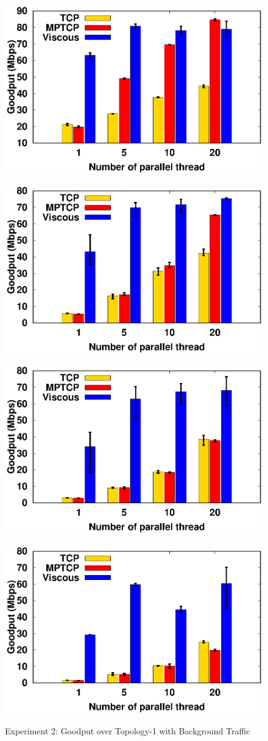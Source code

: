 \begin{figure}[!t]
    \begin{center}
        \begin{minipage}{0.45\linewidth}
            \centering
            \includegraphics[width=0.24\linewidth]{img/exp7/goodput_1}
            \label{fig:exp7_goodput_16}
        \end{minipage}
        \begin{minipage}{0.45\linewidth}
            \centering
            \includegraphics[width=0.24\linewidth]{img/exp7/goodput_5}
            \label{fig:exp7_goodput_80}
        \end{minipage}
        \begin{minipage}{0.45\linewidth}
            \centering
            \includegraphics[width=0.24\linewidth]{img/exp7/goodput_10}
            \label{fig:exp7_goodput_160}
        \end{minipage}
        \begin{minipage}{0.45\linewidth}
            \centering
            \includegraphics[width=0.24\linewidth]{img/exp7/goodput_20}
            \label{fig:exp7_goodput_320}
        \end{minipage}
        \caption{\label{fig:exp7_goodput}Experiment 2: Goodput over Topology-1 with Background Traffic}
    \end{center}
\end{figure}



